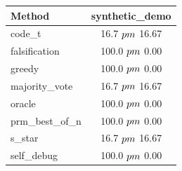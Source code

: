 \begin{tabular}{lc}
\toprule
Method & synthetic_demo \\
\midrule
code_t & 16.7 $\\pm$ 16.67 \\
falsification & 100.0 $\\pm$ 0.00 \\
greedy & 100.0 $\\pm$ 0.00 \\
majority_vote & 16.7 $\\pm$ 16.67 \\
oracle & 100.0 $\\pm$ 0.00 \\
prm_best_of_n & 100.0 $\\pm$ 0.00 \\
s_star & 16.7 $\\pm$ 16.67 \\
self_debug & 100.0 $\\pm$ 0.00 \\
\bottomrule
\end{tabular}
